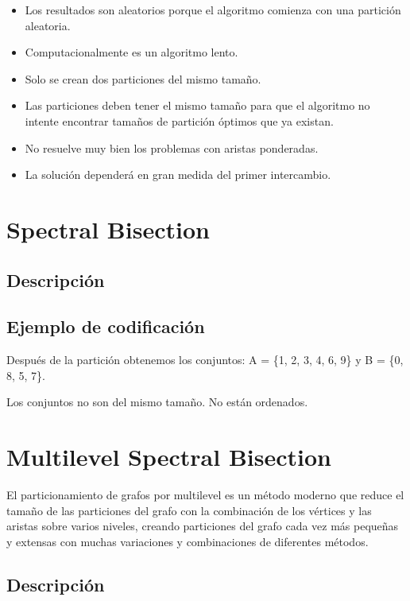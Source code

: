 \begin{itemize}
	\item Los resultados son aleatorios porque el algoritmo comienza con una partición aleatoria.
	\item Computacionalmente es un algoritmo lento.
	\item Solo se crean dos particiones del mismo tamaño.
	\item Las particiones deben tener el mismo tamaño para que el algoritmo no intente encontrar tamaños de partición óptimos que ya existan.
	\item No resuelve muy bien los problemas con aristas ponderadas.
	\item La solución dependerá en gran medida del primer intercambio.
\end{itemize}

\newpage
\section{Spectral Bisection}\label{Spectral-Bisection}

\subsection{Descripción}

\subsection{Ejemplo de codificación}

Después de la partición obtenemos los conjuntos: A = \{1, 2, 3, 4, 6, 9\} y B = \{0, 8, 5, 7\}.

Los conjuntos no son del mismo tamaño. No están ordenados.

\newpage
\section{Multilevel Spectral Bisection}\label{Multilevel-Spectral-Bisection}

El particionamiento de grafos por multilevel es un método moderno que reduce el tamaño de las particiones del grafo con la combinación de los vértices y las aristas sobre varios niveles, creando particiones del grafo cada vez más pequeñas y extensas con muchas variaciones y combinaciones de diferentes métodos.

\subsection{Descripción}\label{msb_description}

